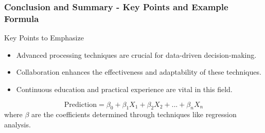\documentclass[aspectratio=169]{beamer}
\begin{document}
\begin{frame}[fragile]
    \frametitle{Conclusion and Summary - Key Points and Example Formula}
    \begin{block}{Key Points to Emphasize}
        \begin{itemize}
            \item Advanced processing techniques are crucial for data-driven decision-making.
            \item Collaboration enhances the effectiveness and adaptability of these techniques.
            \item Continuous education and practical experience are vital in this field.
        \end{itemize}
    \end{block}
    
    \begin{equation}
        \text{Prediction} = \beta_0 + \beta_1 X_1 + \beta_2 X_2 + ... + \beta_n X_n
    \end{equation}
    where \( \beta \) are the coefficients determined through techniques like regression analysis.
\end{frame}
\end{document}

